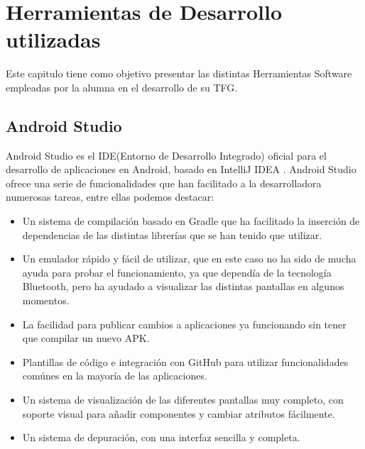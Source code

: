 %
%
%


\chapter{Herramientas de Desarrollo utilizadas} \label{chap:HerramientasSoftware}

Este capitulo tiene como objetivo presentar las distintas Herramientas Software empleadas por la alumna en el desarrollo de su TFG.

\section{Android Studio}

Android Studio \cite{URL::AndroidStudio} es el IDE(Entorno de Desarrollo Integrado) oficial para el desarrollo de aplicaciones en Android, basado en IntelliJ IDEA \cite{URL::IntelliJIDEA}. Android Studio ofrece una serie de funcionalidades que han facilitado a la desarrolladora numerosas tareas, entre ellas podemos destacar:


\begin{itemize}
\item Un sistema de compilación basado en Gradle que ha facilitado la inserción de dependencias de las distintas librerías que se han tenido que utilizar.
\item Un emulador rápido y fácil de utilizar, que en este caso no ha sido de mucha ayuda para probar el funcionamiento, ya que dependía de la tecnología Bluetooth, pero ha ayudado a visualizar las distintas pantallas en algunos momentos.
\item La facilidad para publicar cambios a aplicaciones ya funcionando sin tener que compilar un nuevo APK.
\item Plantillas de código e integración con GitHub para utilizar funcionalidades comúnes en la mayoría de las aplicaciones.
\item Un sistema de visualización de las diferentes pantallas muy completo, con soporte visual para añadir componentes y cambiar atributos fácilmente.
\item Un sistema de depuración, con una interfaz sencilla y completa.
\end{itemize} 


